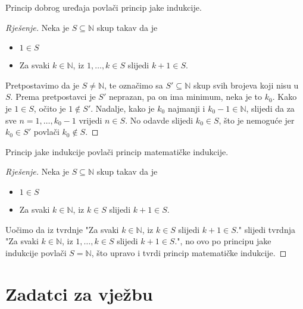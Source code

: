 \begin{exercise}
Princip dobrog uređaja povlači princip jake indukcije.
\end{exercise}
\begin{proof}[Rješenje]
Neka je $S\subseteq \mathbb{N}$ skup takav da je
\begin{itemize}
\item $1\in S$
\item Za svaki $k\in \mathbb{N}$, iz $1, \dots, k\in S$ slijedi $k+1\in S$.
\end{itemize}
Pretpostavimo da je $S\neq \mathbb{N}$, te označimo sa $S'\subseteq \mathbb{N}$ skup svih brojeva koji nisu u $S$. Prema pretpostavci je $S'$ neprazan, pa on ima minimum, neka je to $k_0$. Kako je $1\in S$, očito je $1\notin S'$. Nadalje, kako je $k_0$ najmanji i $k_0-1\in \mathbb{N}$, slijedi da za sve $n=1,\dots, k_0-1$ vrijedi $n\in S$. No odavde slijedi $k_0\in S$, što je nemoguće jer $k_0\in S'$ povlači $k_0\notin S$.
\end{proof}
\begin{exercise}
Princip jake indukcije povlači princip matematičke indukcije.
\end{exercise}
\begin{proof}[Rješenje]
Neka je $S\subseteq \mathbb{N}$ skup takav da je
\begin{itemize}
\item $1\in S$
\item Za svaki $k\in \mathbb{N}$, iz $k\in S$ slijedi $k+1\in S$.
\end{itemize}
Uočimo da iz tvrdnje "Za svaki $k\in \mathbb{N}$, iz $k\in S$ slijedi $k+1\in S$." slijedi tvrdnja "Za svaki $k\in \mathbb{N}$, iz $1, \dots, k\in S$ slijedi $k+1\in S$.", no ovo po principu jake indukcije povlači $S=\mathbb{N}$, što upravo i tvrdi princip matematičke indukcije.
\end{proof}
\newpage
\section*{Zadatci za vježbu}
